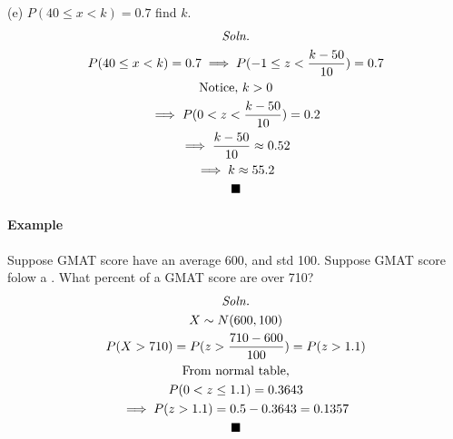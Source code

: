 \documentclass{article}
\begin{document}
		(e) $P(40 \leq x < k) = 0.7$ find $k$.
			\begin{multline*}
				\emph{Soln.} \\
				P(40 \leq x < k) = 0.7 \implies P(-1 \leq z < \frac{k-50}{10}) = 0.7 \\
				\text{{Notice, }} k > 0 \\
				\implies P(0 < z < \frac{k-50}{10}) = 0.2 \\
				\implies \frac{k-50}{10} \approx 0.52 \\
				\implies k \approx 55.2 \\
				\blacksquare
			\end{multline*}


		\paragraph{Example} Suppose GMAT score have an average 600, and std 100. Suppose GMAT score folow a . What percent of a GMAT score are over 710?
			\begin{multline*}
				\emph{Soln.} \\
				X \sim N(600, 100) \\
				P(X > 710) = P(z > \frac{710-600}{100}) = P(z > 1.1) \\
				\text{{From normal table,}} \\
				P(0 < z \leq 1.1) = 0.3643 \\
				\implies P(z > 1.1) = 0.5 - 0.3643 = 0.1357 \\
				\blacksquare
			\end{multline*}
		\newline
\end{document}
